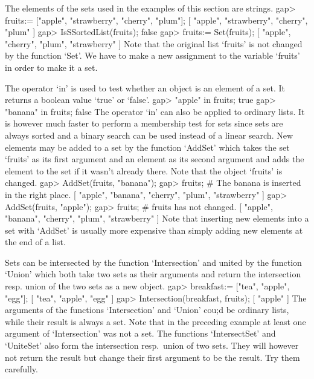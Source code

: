 The elements of the sets used in the examples of this section are
strings.
\beginexample
gap> fruits:= ["apple", "strawberry", "cherry", "plum"];
[ "apple", "strawberry", "cherry", "plum" ]
gap> IsSSortedList(fruits);
false
gap> fruits:= Set(fruits);
[ "apple", "cherry", "plum", "strawberry" ]
\endexample
Note that the original list `fruits' is not changed by the function
`Set'.  We have to make a new assignment to the variable `fruits' in
order to make it a set.

The operator `in' is  used  to test whether an  object is an element of a
set.  It returns a boolean value `true' or `false'.
\beginexample
gap> "apple" in fruits;
true
gap> "banana" in fruits;
false
\endexample
The operator `in' can also be applied to ordinary lists. It is however
much  faster  to perform  a  membership test for   sets since sets are
always  sorted and a  binary search  can be  used  instead of a linear
search.  New elements  may be added to a  set by the function `AddSet'
which takes the  set `fruits' as its first  argument and an element as
its second argument   and adds the element  to  the set  if  it wasn't
already there. Note that the object `fruits' is changed.
\beginexample
gap> AddSet(fruits, "banana");
gap> fruits;  #  The banana is inserted in the right place.
[ "apple", "banana", "cherry", "plum", "strawberry" ]
gap> AddSet(fruits, "apple");
gap> fruits;  #  fruits has not changed.
[ "apple", "banana", "cherry", "plum", "strawberry" ]
\endexample
Note that inserting new elements into a set with `AddSet' is usually more
expensive than simply adding new elements at the end of a list.

Sets can be intersected by the function `Intersection'  and united by the
function `Union' which both take  two sets as their arguments  and return
the intersection resp. union of the two sets as a new object.
\beginexample
gap> breakfast:= ["tea", "apple", "egg"];
[ "tea", "apple", "egg" ]
gap> Intersection(breakfast, fruits);
[ "apple" ]
\endexample
The  arguments  of the functions  `Intersection'  and `Union' cou;d be
ordinary lists, while their  result is always  a set. Note that in the
preceding  example at least one  argument of  `Intersection' was not a
set.   The functions   `IntersectSet' and  `UniteSet'   also form  the
intersection resp.~union of two sets. They will however not return the
result  but change their  first argument  to be  the result.  Try them
carefully.



